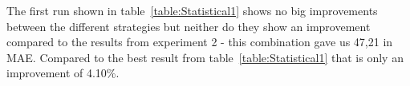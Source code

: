 \begin{table}[H]
\centering  %
\caption{Statistical results} %
\label{table:Statistical1} %
\end{table}

The first run shown in table~\ref{table:Statistical1} shows no big improvements between the different strategies but neither do they show an improvement compared to the results from experiment 2 - this combination gave us 47,21 in MAE. Compared to the best result from table~\ref{table:Statistical1} that is only an improvement of 4.10\%.

